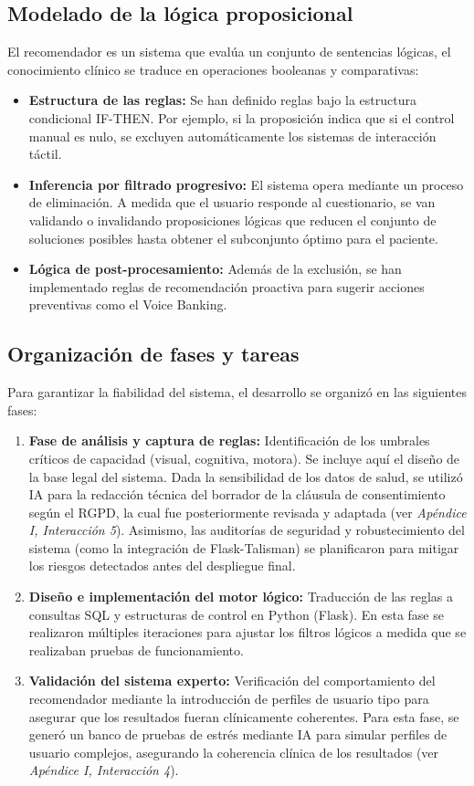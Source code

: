 \subsection{Modelado de la lógica proposicional}
El recomendador es un sistema que evalúa un conjunto de sentencias lógicas, el conocimiento clínico se traduce en operaciones booleanas y comparativas:

\begin{itemize}
    	\item \textbf{Estructura de las reglas:} Se han definido reglas bajo la estructura condicional IF-THEN. Por ejemplo, si la proposición indica que si el control manual es nulo, se excluyen automáticamente los sistemas de interacción táctil.
    	\item \textbf{Inferencia por filtrado progresivo:} El sistema opera mediante un proceso de eliminación. A medida que el usuario responde al cuestionario, se van validando o invalidando proposiciones lógicas que reducen el conjunto de soluciones posibles hasta obtener el 				subconjunto óptimo para el paciente.
    	\item \textbf{Lógica de post-procesamiento:} Además de la exclusión, se han implementado reglas de recomendación proactiva para sugerir acciones preventivas como el Voice Banking.
\end{itemize}

\subsection{Organización de fases y tareas}
Para garantizar la fiabilidad del sistema, el desarrollo se organizó en las siguientes fases:

\begin{enumerate}
    	\item \textbf{Fase de análisis y captura de reglas:} Identificación de los umbrales críticos de capacidad (visual, cognitiva, motora). Se incluye aquí el diseño de la base legal del sistema. Dada la sensibilidad de los datos de salud, se utilizó IA para la redacción técnica del borrador de la 	cláusula de consentimiento según el RGPD, la cual fue posteriormente revisada y adaptada (ver \textit{Apéndice I, Interacción 5}). Asimismo, las auditorías de seguridad y robustecimiento del sistema (como la integración de Flask-Talisman) se planificaron para mitigar los riesgos 			detectados antes del despliegue final.
    	\item \textbf{Diseño e implementación del motor lógico:} Traducción de las reglas a consultas SQL y estructuras de control en Python (Flask). En esta fase se realizaron múltiples iteraciones para ajustar los filtros lógicos a medida que se realizaban pruebas de funcionamiento.
    	\item \textbf{Validación del sistema experto:} Verificación del comportamiento del recomendador mediante la introducción de perfiles de usuario tipo para asegurar que los resultados fueran clínicamente coherentes. Para esta fase, se generó un banco de pruebas de estrés 				mediante IA para simular perfiles de usuario complejos, asegurando la coherencia clínica de los resultados (ver \textit{Apéndice I, Interacción 4}).
\end{enumerate}


